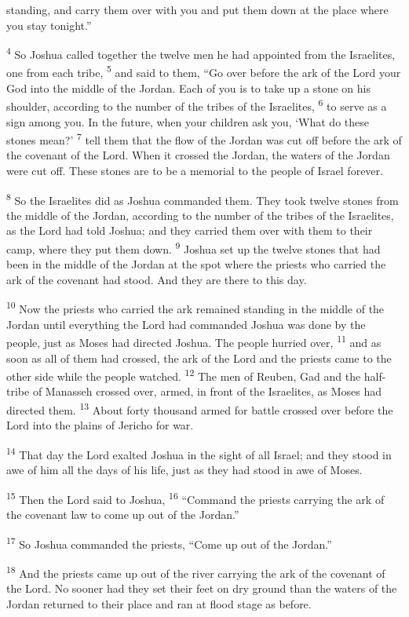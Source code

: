 \documentclass[12pt,twoside]{article}
\newcommand{\vs}[1]{\textsuperscript{#1}}
\begin{document}
\noindent standing, and carry them over with you and put them down at the place where you stay tonight.''

\vs{4} So Joshua called together the twelve men he had appointed from the Israelites, one from each tribe,
\vs{5} and said to them, ``Go over before the ark of the Lord your God into the middle of the Jordan. Each of you is to take up a stone on his shoulder, according to the number of the tribes of the Israelites,
\vs{6} to serve as a sign among you. In the future, when your children ask you, `What do these stones mean?'
\vs{7} tell them that the flow of the Jordan was cut off before the ark of the covenant of the Lord. When it crossed the Jordan, the waters of the Jordan were cut off. These stones are to be a memorial to the people of Israel forever.

\vs{8} So the Israelites did as Joshua commanded them. They took twelve stones from the middle of the Jordan, according to the number of the tribes of the Israelites, as the Lord had told Joshua; and they carried them over with them to their camp, where they put them down.
\vs{9} Joshua set up the twelve stones that had been in the middle of the Jordan at the spot where the priests who carried the ark of the covenant had stood. And they are there to this day.

\vs{10} Now the priests who carried the ark remained standing in the middle of the Jordan until everything the Lord had commanded Joshua was done by the people, just as Moses had directed Joshua. The people hurried over,
\vs{11} and as soon as all of them had crossed, the ark of the Lord and the priests came to the other side while the people watched.
\vs{12} The men of Reuben, Gad and the half-tribe of Manasseh crossed over, armed, in front of the Israelites, as Moses had directed them.
\vs{13} About forty thousand armed for battle crossed over before the Lord into the plains of Jericho for war.

\vs{14} That day the Lord exalted Joshua in the sight of all Israel; and they stood in awe of him all the days of his life, just as they had stood in awe of Moses.

\vs{15} Then the Lord said to Joshua,
\vs{16} ``Command the priests carrying the ark of the covenant law to come up out of the Jordan.''

\vs{17} So Joshua commanded the priests, ``Come up out of the Jordan.''

\vs{18} And the priests came up out of the river carrying the ark of the covenant of the Lord. No sooner had they set their feet on dry ground than the waters of the Jordan returned to their place and ran at flood stage as before.
\end{document}
